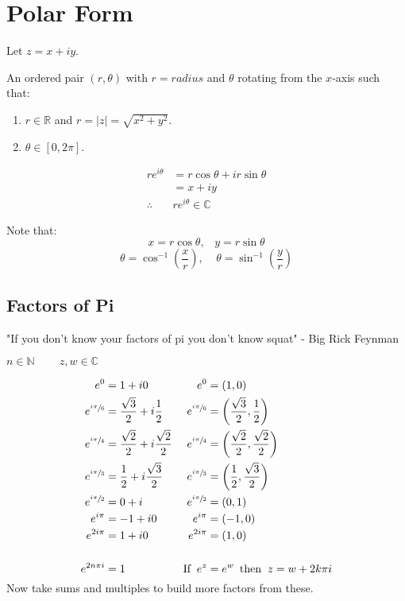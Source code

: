 \section{Polar Form}

Let $z = x +iy.$

\begin{defn}
	An ordered pair $(r, \theta)$ with $r = radius$ and $\theta$ rotating from the $x$-axis such that:
	\begin{enumerate}
		\item $r \in \mathbb{R}$ and $r = |z| = \sqrt{x^2 + y^2}.$
		\item $\theta  \in [0, 2\pi].$
	\end{enumerate}
\end{defn}
\begin{defn}
	\begin{align*}
		re^{i\theta} &= r\cos{\theta} + ir\sin{\theta} \\
		&= x + iy \\
		\therefore \;\; &re^{i\theta} \in \mathbb{C}
	\end{align*}
\end{defn}
Note that:
\[x = r\cos{\theta}, \;\;\; y = r\sin{\theta}\]
\[\theta = \cos^{-1}{ \left( \frac{x}{r} \right)  }, \;\;\;\; \theta = \sin^{-1} \left( { \frac{y}{r} } \right) \]
\subsection{Factors of Pi}
\begin{defn}
	"If you don't know your factors of pi you don't know squat" - Big Rick Feynman

	\begin{center}
		$n \in \mathbb{N} \;\;\;\;\;\;\;\; z, w \in \mathbb{C}$
	\end{center}
	\begin{align*}
		e^{0} &= 1 + i0 & e^{0} &= (1, 0) \\
		e^{\sfrac{i\pi}{6}} &= \frac{\sqrt{3}}{2} + i\frac{1}{2} & e^{\sfrac{i\pi}{6}} &= \left( \frac{\sqrt{3}}{2}, \frac{1}{2} \right)  \\
		e^{\sfrac{i\pi}{4}} &= \frac{\sqrt{2}}{2} + i\frac{\sqrt{2}}{2} & e^{\sfrac{i\pi}{4}} &= \left( \frac{\sqrt{2}}{2}, \frac{\sqrt{2}}{2} \right) \\
		e^{\sfrac{i\pi}{3}} &= \frac{1}{2} + i\frac{\sqrt{3}}{2} & e^{\sfrac{i\pi}{3}} &= \left(\frac{1}{2}, \frac{\sqrt{3}}{2} \right) \\
		e^{\sfrac{i\pi}{2}} &= 0 +  i & e^{\sfrac{i\pi}{2}} &= (0, 1) \\
		e^{i\pi} &= -1 + i0 & e^{i\pi} &= (-1, 0) \\
		e^{2i\pi} &= 1 + i0 & e^{2i\pi} &= (1, 0) \\
		\\
		e^{2n\pi i} &= 1 &\text{If} \;\; e^z &= e^w \;\: \text{then} \;\; z = w + 2k\pi i \\
	\end{align*}
	Now take sums and multiples to build more factors from these.
\end{defn}
 
